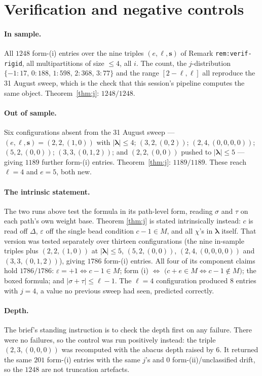 \documentclass[11pt]{article}
\theoremstyle{definition}
\theoremstyle{remark}
\newcommand{\bl}{\boldsymbol{\lambda}}
\newcommand{\bs}{\mathbf{s}}
\begin{document}
\section{Verification and negative controls}\label{sec:controls}

\paragraph{In sample.} All $1248$ form-(i) entries over the nine triples $(e,\ell,\bs)$
of Remark \texttt{rem:verif-rigid}, all multipartitions of size $\le4$, all $i$. The
count, the $j$-distribution $\{-1{:}17,\,0{:}188,\,1{:}598,\,2{:}368,\,3{:}77\}$ and the
range $[2-\ell,\ell]$ all reproduce the 31 August sweep, which is the check that this
session's pipeline computes the same object. Theorem~\ref{thm:j}: $1248/1248$.

\paragraph{Out of sample.} Six configurations absent from the 31 August sweep ---
$(e,\ell,\bs)=(2,2,(1,0))$ with $|\bl|\le4$; $(3,2,(0,2))$; $(2,4,(0,0,0,0))$;
$(5,2,(0,0))$; $(3,3,(0,1,2))$; and $(2,2,(0,0))$ pushed to $|\bl|\le5$ --- giving
$1189$ further form-(i) entries. Theorem~\ref{thm:j}: $1189/1189$. These reach $\ell=4$
and $e=5$, both new.

\paragraph{The intrinsic statement.} The two runs above test the formula in its
path-level form, reading $\sigma$ and $\tau$ on each path's own weight base. Theorem
\ref{thm:j} is stated intrinsically instead: $c$ is read off $\Delta$, $\varepsilon$
off the single bead condition $c-1\in M$, and all $\chi$'s in $\bl$ itself. That
version was tested separately over thirteen configurations (the nine in-sample triples
plus $(2,2,(1,0))$ at $|\bl|\le5$, $(5,2,(0,0))$, $(2,4,(0,0,0,0))$ and
$(3,3,(0,1,2))$), giving $1786$ form-(i) entries. All four of its component claims hold
$1786/1786$: $\varepsilon=+1\iff c-1\in M$; form (i) $\iff$
$\big(c+e\in M\iff c-1\notin M\big)$; the boxed formula; and
$|\sigma+\tau|\le\ell-1$. The $\ell=4$ configuration produced $8$ entries with
$j=4$, a value no previous sweep had seen, predicted correctly.

\paragraph{Depth.} The brief's standing instruction is to check the depth first on any
failure. There were no failures, so the control was run positively instead: the triple
$(2,3,(0,0,0))$ was recomputed with the abacus depth raised by $6$. It returned the same
$201$ form-(i) entries with the same $j$'s and $0$ form-(ii)/unclassified drift, so the
$1248$ are not truncation artefacts.
\end{document}
